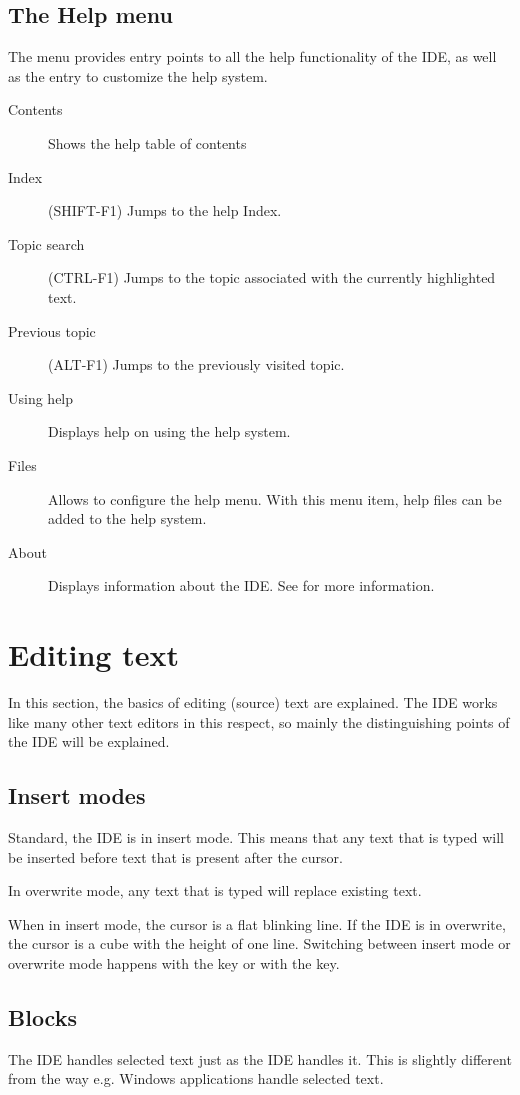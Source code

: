 \subsection{The Help menu}
\label{se:menuhelp}
The  menu provides entry points to all the help functionality of
the IDE, as well as the entry to customize the help system.
\begin{description}
\item[Contents]
Shows the help table of contents
\item[Index] (SHIFT-F1)
Jumps to the help Index.
\item[Topic search]  (CTRL-F1)
Jumps to the topic associated with the currently highlighted text.
\item[Previous topic] (ALT-F1)
Jumps to the previously visited topic.
\item[Using help]
Displays help on using the help system.
\item[Files]
Allows to configure the help menu. With this menu item,  help files can be added to the help
system. 
\item[About]
Displays information about the IDE. See  for more information.
\end{description}

\section{Editing text}
\label{se:editingtext}
In this section, the basics of editing (source) text are explained. The IDE
works like many other text editors in this respect, so mainly the
distinguishing points of the IDE will be explained.

\subsection{Insert modes}
Standard, the IDE is in insert mode. This means that any text that is typed
will be inserted before text that is present after the cursor. 

In overwrite mode, any text that is typed will replace existing text. 

When in insert mode, the cursor is a flat blinking line. If the IDE is in
overwrite, the cursor is a cube with the height of one line. Switching between
insert mode or overwrite mode happens with the  key or with the
 key.
%
%
\subsection{Blocks}
\label{se:blocks}
The IDE handles selected text just as the \tp IDE handles it. This is
slightly different from the way e.g. Windows applications handle selected
text. 

